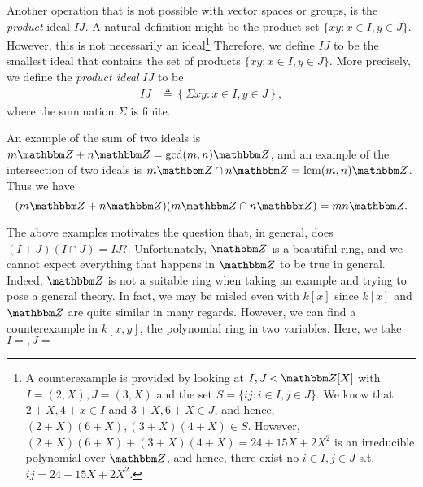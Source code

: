 Another operation that is not possible with vector spaces or groups, is the {\it product} ideal $I J$. A natural definition might be the product set $\{x y: x \in I, y \in J\}$. However, this is not necessarily an ideal\footnote{A counterexample \citep{stacknotproduct} is provided by looking at $I,J\lhd \Z[X]$ with $I=(2,X), J=(3,X)$ and the set $S = \{i j: i \in I, j \in J\}$. We know that $2+X, 4+x \in I$ and $3+X, 6+X \in J$, and hence, $(2+X)(6+X), (3+X)(4+X)\in S$. However, $(2+X)(6+X)+(3+X)(4+X)=24+15X+2X^2$ is an irreducible
polynomial over $\Z$, and hence, there exist no $i \in I,j\in J$ s.t. $ij = 24+15X+2X^2.$}  Therefore, we define $I J$ to be the smallest ideal that contains the set of products $\{x y: x \in I, y \in J\}$. More precisely, we define the {\it product ideal} $IJ$ to be
\[
\begin{aligned}
    I J 
    &\triangleq\left\{\Sigma x y: x \in I, y \in J\right\},
\end{aligned}
\]
where the summation $\Sigma$ is finite.
\begin{example}
    An example of the sum of two ideals is $m {\Z}+n {\Z}=\operatorname{gcd}(m, n) {\Z}$, and an example of the intersection of two ideals is  $m {\Z} \cap n {\Z} = \operatorname{lcm}(m, n) {\Z}$. Thus we have
    \[(m {\Z}+n {\Z})(m {\Z} \cap n {\Z}) = mn \Z.\]
\end{example}  
The above examples motivates the question that, in general, does $(I+J)(I \cap J)=I J ?$. Unfortunately, ${\Z}$ is a beautiful ring, and we cannot expect everything that happens in ${\Z}$ to be true in general. Indeed, ${\Z}$ is not a suitable ring when taking an example and trying to pose a general theory. In fact, we may be misled even with $k[x]$ since $k[x]$ and $\Z$ are quite similar in many regards. However, we can find a counterexample in $k[x, y]$, the polynomial ring in two variables. Here, we take $I = , J = $ 

